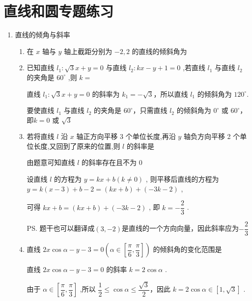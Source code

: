 \chapter*{直线和圆专题练习}
\begin{enumerate}
    \item 直线的倾角与斜率
    \begin{enumerate}
        \item 在 $x$ 轴与 $y$ 轴上截距分别为 $-2,2$ 的直线的倾斜角为
        \item 已知直线 ${l}_{1} : \sqrt{3}x + y = 0$ 与直线 ${l}_{2} : {kx} - y + 1 = 0$ ,若直线 ${l}_{1}$ 与直线 ${l}_{2}$ 的夹角是 ${60}^{ \circ  }$ ,则 $k = $
        \begin{jieda}
            直线 ${l}_{1} : \sqrt{3}x + y = 0$ 的斜率为 ${k}_{1} =  - \sqrt{3}$，所以直线 ${l}_{1}$ 的倾斜角为 ${120}^{ \circ  }$.
            
            要使直线 ${l}_{1}$ 与直线 ${l}_{2}$ 的夹角是 ${60}^{ \circ  }$，只需直线 ${l}_{2}$ 的倾斜角为 ${0}^{ \circ  }$ 或 ${60}^{ \circ  }$，即$k = 0$ 或 $\sqrt{3}$
        \end{jieda}
        \item 若将直线 $l$ 沿 $x$ 轴正方向平移 3 个单位长度,再沿 $y$ 轴负方向平移 2 个单位长度,又回到了原来的位置,则 $l$ 的斜率是
        \begin{jieda}
            由题意可知直线 $l$ 的斜率存在且不为 0
            
            设直线 $l$ 的方程为 $y = {kx} + b\left( {k \neq  0}\right)$ , 则平移后直线的方程为 $y = k\left( {x - 3}\right)  + b - 2 = \left( {{kx} + b}\right)  + \left( {-{3k} - 2}\right)$ ,
            
            可得 ${kx} + b = \left( {{kx} + b}\right)  + \left( {-{3k} - 2}\right)$ , 即 $k =  - \dfrac{2}{3}$ .

            \ps 题干也可以翻译成$(3, -2)$是直线的一个方向向量，因此斜率应为$- \dfrac{2}{3}$
        \end{jieda}
        \item 直线 ${2x}\cos \alpha  - y - 3 = 0\left( {\alpha  \in  \left\lbrack  {\dfrac{\pi }{6},\dfrac{\pi }{3}}\right\rbrack  }\right)$ 的倾斜角的变化范围是
        \begin{jieda}
            直线 ${2x}\cos \alpha  - y - 3 = 0$ 的斜率 $k = 2\cos \alpha$ .

            由于 $\alpha  \in  \left\lbrack  {\dfrac{\pi }{6},\dfrac{\pi }{3}}\right\rbrack$ ,所以 $\dfrac{1}{2} \leq  \cos \alpha  \leq  \dfrac{\sqrt{3}}{2}$，因此 $k = 2\cos \alpha  \in  \left\lbrack  {1,\sqrt{3}}\right\rbrack$ .
            

\end{jieda}
\end{enumerate}
\end{enumerate}
